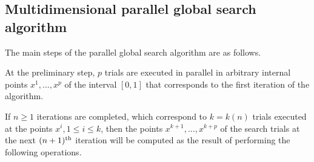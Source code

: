 \documentclass{svproc}
\begin{document}
\subsection{Multidimensional parallel global search algorithm}\label{SecGSA}

The main steps of the parallel global search algorithm are as follows.

At the preliminary step, $p$ trials are executed in parallel in arbitrary internal points $x^1, ...,x^p$ of  the interval $[0,1]$ that corresponds to the first iteration of the algorithm. 

If $n \geq 1$ iterations are completed, which correspond to $k=k(n)$ trials executed at the points $x^i, 1\leq i\leq  k$, then the points $x^{k+1},\ldots,x^{k+p}$ of the search trials at the next $(n+1)^{\rm  th}$ iteration will be computed as the result of performing the following operations.
\end{document}
